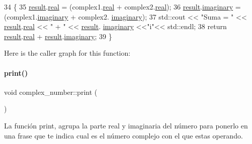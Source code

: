 \begin{DoxyCode}
34                                                                             \{
35   \hyperlink{complejo_8cc_a3d01611ed0f921d1c40a739b2ca8c9fa}{result}.\hyperlink{classcomplex__number_a57a6f97bb6028f8f98c321514d2aa7a0}{real} = (complex1.\hyperlink{classcomplex__number_a57a6f97bb6028f8f98c321514d2aa7a0}{real} + complex2.\hyperlink{classcomplex__number_a57a6f97bb6028f8f98c321514d2aa7a0}{real});
36   \hyperlink{complejo_8cc_a3d01611ed0f921d1c40a739b2ca8c9fa}{result}.\hyperlink{classcomplex__number_a809ebdf297fb9093cf4c6f1e2728be90}{imaginary} = (complex1.\hyperlink{classcomplex__number_a809ebdf297fb9093cf4c6f1e2728be90}{imaginary} + complex2.
      \hyperlink{classcomplex__number_a809ebdf297fb9093cf4c6f1e2728be90}{imaginary});
37   std::cout << \textcolor{stringliteral}{"Suma = "} << \hyperlink{complejo_8cc_a3d01611ed0f921d1c40a739b2ca8c9fa}{result}.\hyperlink{classcomplex__number_a57a6f97bb6028f8f98c321514d2aa7a0}{real} << \textcolor{stringliteral}{" + "} << \hyperlink{complejo_8cc_a3d01611ed0f921d1c40a739b2ca8c9fa}{result}.
      \hyperlink{classcomplex__number_a809ebdf297fb9093cf4c6f1e2728be90}{imaginary} <<\textcolor{stringliteral}{"i"}<< std::endl;
38   \textcolor{keywordflow}{return} \hyperlink{complejo_8cc_a3d01611ed0f921d1c40a739b2ca8c9fa}{result}.\hyperlink{classcomplex__number_a57a6f97bb6028f8f98c321514d2aa7a0}{real} + \hyperlink{complejo_8cc_a3d01611ed0f921d1c40a739b2ca8c9fa}{result}.\hyperlink{classcomplex__number_a809ebdf297fb9093cf4c6f1e2728be90}{imaginary};
39 \}
\end{DoxyCode}
Here is the caller graph for this function\+:
\mbox{\label{classcomplex__number_a8700aec615b980b0c20f8c181ea1d5ff}} 
\paragraph{\texorpdfstring{print()}{print()}}
{\footnotesize\ttfamily void complex\+\_\+number\+::print (\begin{DoxyParamCaption}{ }\end{DoxyParamCaption})}



La función print, agrupa la parte real y imaginaria del número para ponerlo en una frase que te indica cual es el número complejo con el que estas operando. 



